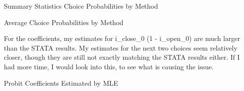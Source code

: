 \documentclass[12pt]{article}
\begin{document}
\begin{table}[!htbp]
	\centering 
	\caption{Summary Statistics Choice Probabilities by Method}\label{tab_prob_observed}
	
\end{table}

\begin{table}[!htbp]
\centering 
\caption{Average Choice Probabilities by Method}\label{tab_prob}

\end{table}

\FloatBarrier
\clearpage 
For the coefficients, my estimates for i\_close\_0 (1 - i\_open\_0) are much larger than the STATA results. My estimates for the next two choices seem relatively closer, though they are still not exactly matching the STATA results either. If I had more time, I would look into this, to see what is causing the issue.
\begin{table}[!htbp]
	\centering 
	\caption{Probit Coefficients Estimated by MLE}\label{tab_mle}
	
\end{table}
\end{document}

